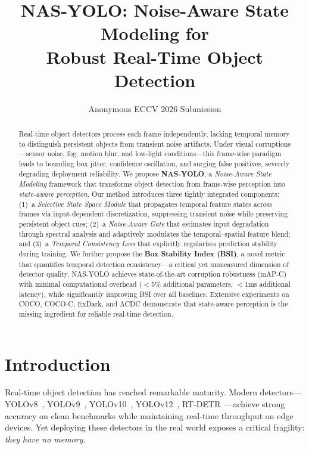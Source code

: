 \documentclass[review]{eccv2026}
\title{NAS-YOLO: Noise-Aware State Modeling for\\Robust Real-Time Object Detection}
\author{Anonymous ECCV 2026 Submission}
\begin{document}
\maketitle

\begin{abstract}
Real-time object detectors process each frame independently, lacking temporal memory to distinguish persistent objects from transient noise artifacts.
Under visual corruptions---sensor noise, fog, motion blur, and low-light conditions---this frame-wise paradigm leads to bounding box jitter, confidence oscillation, and surging false positives, severely degrading deployment reliability.
We propose \textbf{NAS-YOLO}, a \textit{Noise-Aware State Modeling} framework that transforms object detection from frame-wise perception into \textit{state-aware perception}.
Our method introduces three tightly integrated components:
(1)~a \textit{Selective State Space Module} that propagates temporal feature states across frames via input-dependent discretization, suppressing transient noise while preserving persistent object cues;
(2)~a \textit{Noise-Aware Gate} that estimates input degradation through spectral analysis and adaptively modulates the temporal--spatial feature blend;
and (3)~a \textit{Temporal Consistency Loss} that explicitly regularizes prediction stability during training.
We further propose the \textbf{Box Stability Index (BSI)}, a novel metric that quantifies temporal detection consistency---a critical yet unmeasured dimension of detector quality.
NAS-YOLO achieves state-of-the-art corruption robustness (mAP-C) with minimal computational overhead ($<$5\% additional parameters, $<$1ms additional latency), while significantly improving BSI over all baselines.
Extensive experiments on COCO, COCO-C, ExDark, and ACDC demonstrate that state-aware perception is the missing ingredient for reliable real-time detection.
\end{abstract}

\section{Introduction}
\label{sec:intro}

Real-time object detection has reached remarkable maturity.
Modern detectors---YOLOv8~\cite{yolov8}, YOLOv9~\cite{yolov9}, YOLOv10~\cite{yolov10}, YOLOv12~\cite{yolov12}, RT-DETR~\cite{rtdetr}---achieve strong accuracy on clean benchmarks while maintaining real-time throughput on edge devices.
Yet deploying these detectors in the real world exposes a critical fragility: \textit{they have no memory}.
\end{document}
